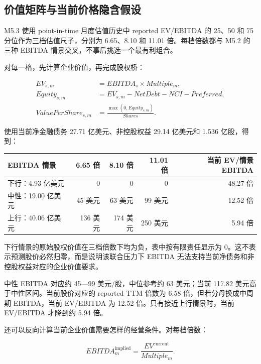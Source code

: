 \documentclass[11pt,a4paper]{ctexart}
\begin{document}
\subsection{价值矩阵与当前价格隐含假设}

M5.3 使用 point-in-time 月度估值历史中 reported EV/EBITDA 的 25、50 和 75 分位作为三档估值尺子，分别为 6.65、8.10 和 11.01 倍。每档倍数都与 M5.2 的三种 EBITDA 情景交叉，不事后挑选一个最有利组合。

对每一格，先计算企业价值，再完成股权桥：

\begin{align*}
EV_{s,m} &= EBITDA_s\times Multiple_m, \\
Equity_{s,m} &= EV_{s,m}-NetDebt-NCI-Preferred, \\
ValuePerShare_{s,m} &= \frac{\max(0,Equity_{s,m})}{Shares}.
\end{align*}

使用当前净金融债务 27.71 亿美元、非控股权益 29.14 亿美元和 1.536 亿股，得到：

\begin{center}
\small
\begin{tabularx}{\textwidth}{L{3.3cm}r r r r}
\toprule
EBITDA 情景 & 6.65 倍 & 8.10 倍 & 11.01 倍 & 当前 EV/情景 EBITDA \\
\midrule
下行：4.93 亿美元 & 0 & 0 & 0 & 48.27 倍 \\
中性：19.00 亿美元 & 45 美元 & 63 美元 & 99 美元 & 12.52 倍 \\
上行：40.06 亿美元 & 136 美元 & 174 美元 & 250 美元 & 5.94 倍 \\
\bottomrule
\end{tabularx}
\normalsize
\end{center}

下行情景的原始股权价值在三档倍数下均为负，表中按有限责任显示为 0。这不表示预测股价必然归零，而是说明该联合压力下 EBITDA 无法支持当前净债务和非控股权益对应的企业价值要求。

中性 EBITDA 对应约 45---99 美元/股，中位参考约 63 美元；当前 117.82 美元高于中性区间。当前股价对应的 reported TTM 倍数为 6.58 倍，但若分母换成中周期 EBITDA，当前 EV/EBITDA 为 12.52 倍。只有接近上行情景时，当前 EV/EBITDA 才降到约 5.94 倍。

还可以反向计算当前企业价值需要怎样的经营条件。对每档倍数：

\begin{equation*}
EBITDA^{\mathrm{implied}}_m=\frac{EV^{\mathrm{current}}}{Multiple_m}.
\end{equation*}
\end{document}
